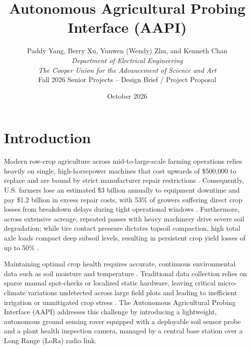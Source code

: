 \documentclass[12pt, letterpaper]{article}
\title{\textbf{Autonomous Agricultural Probing Interface (AAPI)}}
\author{Paddy Yang, Berry Xu, Yunwen (Wendy) Zhu, and Kenneth Chan \\
\textit{Department of Electrical Engineering} \\
\textit{The Cooper Union for the Advancement of Science and Art} \\
\small{Fall 2026 Senior Projects -- Design Brief / Project Proposal}}
\date{October 2026}
\begin{document}
\maketitle
\thispagestyle{empty}
\newpage
\setcounter{page}{1}

\section{Introduction}
Modern row-crop agriculture across mid-to-large-scale farming operations relies heavily on single, high-horsepower machines that cost upwards of \$500,000 to replace and are bound by strict manufacturer repair restrictions \cite{pirg2023}. Consequently, U.S. farmers lose an estimated \$3 billion annually to equipment downtime and pay \$1.2 billion in excess repair costs, with 53\% of growers suffering direct crop losses from breakdown delays during tight operational windows \cite{pirg2023}. Furthermore, across extensive acreage, repeated passes with heavy machinery drive severe soil degradation; while tire contact pressure dictates topsoil compaction, high total axle loads compact deep subsoil levels, resulting in persistent crop yield losses of up to 50\% \cite{shaheb2021}. 

Maintaining optimal crop health requires accurate, continuous environmental data such as soil moisture and temperature \cite{instructables2017}. Traditional data collection relies on sparse manual spot-checks or localized static hardware, leaving critical micro-climate variations undetected across large field plots and leading to inefficient irrigation or unmitigated crop stress \cite{jawad2017}. The Autonomous Agricultural Probing Interface (AAPI) addresses this challenge by introducing a lightweight, autonomous ground sensing rover equipped with a deployable soil sensor probe and a plant health inspection camera, managed by a central base station over a Long Range (LoRa) radio link.
\end{document}

